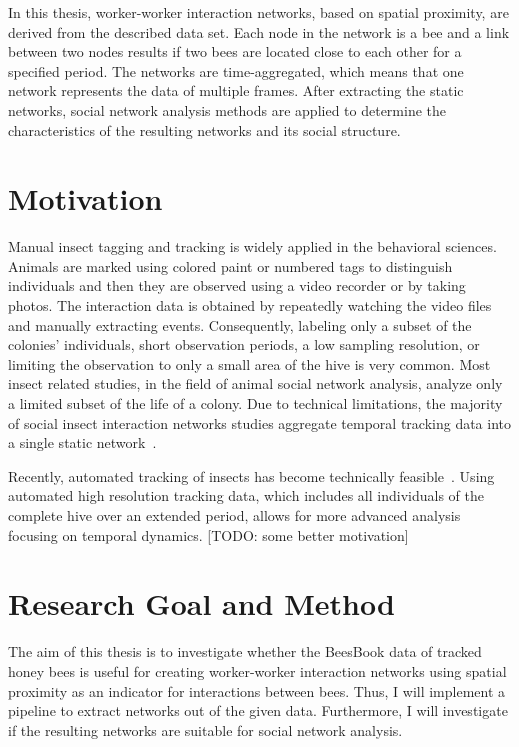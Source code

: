 In this thesis, worker-worker interaction networks, based on spatial proximity, are derived from the described data set. Each node in the network is a bee and a link between two nodes results if two bees are located close to each other for a specified period.
The networks are time-aggregated, which means that one network represents the data of multiple frames.
After extracting the static networks, social network analysis methods are applied to determine the characteristics of the resulting networks and its social structure.

\section{Motivation}
\label{sec:intro:motivation}
Manual insect tagging and tracking is widely applied in the behavioral sciences.
Animals are marked using colored paint or numbered tags to distinguish individuals and then they are observed using a video recorder or by taking photos.
The interaction data is obtained by repeatedly watching the video files and manually extracting events.
Consequently, labeling only a subset of the colonies' individuals, short observation periods, a low sampling resolution, or limiting the observation to only a small area of the hive is very common.
Most insect related studies, in the field of animal social network analysis, analyze only a limited subset of the life of a colony.
Due to technical limitations, the majority of social insect interaction networks studies aggregate temporal tracking data into a single static network~\cite[Chapter~15]{krause2014animal}.

Recently, automated tracking of insects has become technically feasible~\cite{wario2015automatic, crall2015beetag, fiala2005comparing}.
Using automated high resolution tracking data, which includes all individuals of the complete hive over an extended period, allows for more advanced analysis focusing on temporal dynamics.
[TODO: some better motivation]


\section{Research Goal and Method}
\label{sec:intro:goals}
The aim of this thesis is to investigate whether the BeesBook data of tracked honey bees is useful for creating worker-worker interaction networks using spatial proximity as an indicator for interactions between bees.
Thus, I will implement a pipeline to extract networks out of the given data. Furthermore, I will investigate if the resulting networks are suitable for social network analysis.

